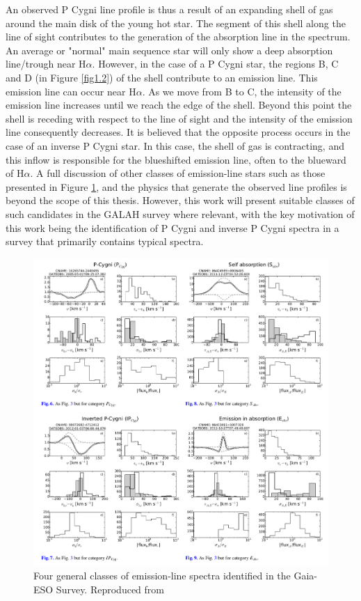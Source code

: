 An observed P Cygni line profile is thus a result of an expanding shell of gas around the main disk of the young hot star. The segment of this shell along the line of sight contributes to the generation of the absorption line in the spectrum. An average or "normal" main sequence star will only show a deep absorption line/trough near H$\alpha$. However, in the case of a P Cygni star, the regions B, C and D (in Figure \ref{fig1.2}) of the shell contribute to an emission line. This emission line can occur near H$\alpha$. As we move from B to C, the intensity of the emission line increases until we reach the edge of the shell. Beyond this point the shell is receding with respect to the line of sight and the intensity of the emission line consequently decreases. It is believed that the opposite process occurs in the case of an inverse P Cygni star. In this case, the shell of gas is contracting, and this inflow is responsible for the blueshifted emission line, often to the blueward of H$\alpha$. A full discussion of other classes of emission-line stars such as those presented in Figure \ref{fig1.3}, and the physics that generate the observed line profiles is beyond the scope of this thesis. However, this work will present suitable classes of such candidates in the GALAH survey where relevant, with the key motivation of this work being the identification of P Cygni and inverse P Cygni spectra in a survey that primarily contains typical spectra.

\begin{figure}[!htb]
\centering
\includegraphics[scale=.50]{figures/p cygni and inverse p cygni.png}
\caption{Four general classes of emission-line spectra identified in the Gaia-ESO Survey. Reproduced from \citet{traven2015gaia}}
\label{fig1.3}
\end{figure}

